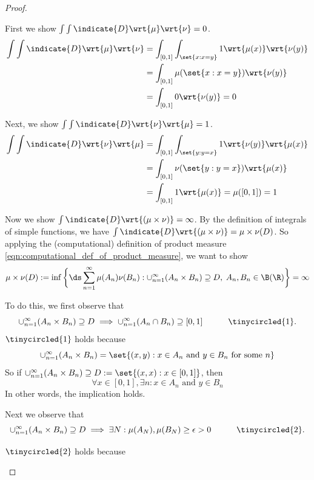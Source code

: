 \documentclass{article} %
\begin{document}
\begin{proof}

\begin{alphabate}
\item First we show $\int \int \indicate{D} \wrt{\mu} \wrt{\nu} = 0$.
%
\begin{align*}
\int \int \indicate{D} \wrt{\mu} \wrt{\nu} 
& = \int_{[0,1]} \int_{\set{x: x=y}} 1 \wrt{\mu(x)} \wrt{\nu(y)} \\
& = \int_{[0,1]} \mu(\set{x: x=y}) \wrt{\nu(y)} \\
&= \int_{[0,1]} 0 \wrt{\nu(y)} = 0
\end{align*}
\item Next, we show $\int \int \indicate{D} \wrt{\nu} \wrt{\mu}  = 1$.
%
\begin{align*}
\int \int \indicate{D}  \wrt{\nu} \wrt{\mu} 
& = \int_{[0,1]} \int_{\set{y: y=x}} 1  \wrt{\nu(y)} \wrt{\mu(x)} \\
& = \int_{[0,1]} \nu(\set{y: y=x}) \wrt{\mu(x)} \\
&= \int_{[0,1]} 1 \wrt{\mu(x)} = \mu([0,1]) = 1
\end{align*}

\item Now we show $\int \indicate{D} \wrt{(\mu \times \nu)} = \infty$. By the definition of integrals of simple functions, we have $\int \indicate{D} \wrt{(\mu \times \nu)} = \mu \times \nu(D)$.  So applying the (computational) definition of product measure \eqref{eqn:computational_def_of_product_measure}, we want to show 
\begin{align}
\mu \times \nu(D): = \inf \bigg\{ \ds\sum_{n=1}^\infty \mu(A_n) \nu(B_n) : \cup_{n=1}^\infty (A_n \times B_n) \supseteq D, \; A_n, B_n \in \B(\R)\bigg\} = \infty 
\label{eqn:lesbegue_counting_product_measure_of_diagonal_of_unit_square_is_infinity}
\end{align}


To do this, we first observe that
\[\cup_{n=1}^\infty (A_n \times B_n) \supseteq D \implies \cup_{n=1}^\infty (A_n \cap B_n) \supseteq [0,1] \quad \quad \quad \tinycircled{1}. \]
%
{\tiny $\tinycircled{1}$ holds because
\[\cup_{n=1}^\infty (A_n \times B_n) = \set{(x,y) : x \in A_n \text{ and } y \in B_n \text{ for some } n } \] 
So if $\cup_{n=1}^\infty (A_n \times B_n) \supseteq D:=\set{(x,x) : x \in [0,1]}$, then 
\[ \forall x \in [0,1], \exists n : x \in A_n \text{ and } y \in B_n \]
In other words, the implication holds. }

Next we observe that
\[\cup_{n=1}^\infty (A_n \times B_n) \supseteq D \implies \exists N : \mu(A_N), \mu(B_N) \geq \epsilon > 0 \quad \quad \quad \tinycircled{2}. \]
%
{\tiny $\tinycircled{2}$ holds because

}
\end{alphabate}
\end{proof}
\end{document}
